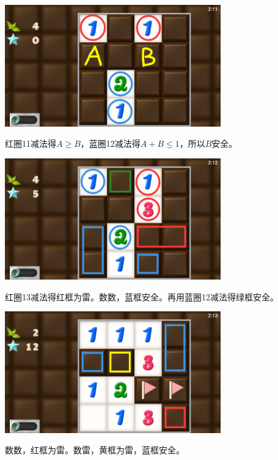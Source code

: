 \subsection{} %
\begin{center}
    \includegraphics[width=0.7\textwidth]{puzzle/142-1.png}
\end{center}
红圈11减法得$A\ge B$，蓝圈12减法得$A+B\le 1$，所以$B$安全。
\begin{center}
    \includegraphics[width=0.7\textwidth]{puzzle/142-2.png}
\end{center}
红圈13减法得红框为雷。数数，蓝框安全。再用蓝圈12减法得绿框安全。
\begin{center}
    \includegraphics[width=0.7\textwidth]{puzzle/142-3.png}
\end{center}
数数，红框为雷。数雷，黄框为雷，蓝框安全。

